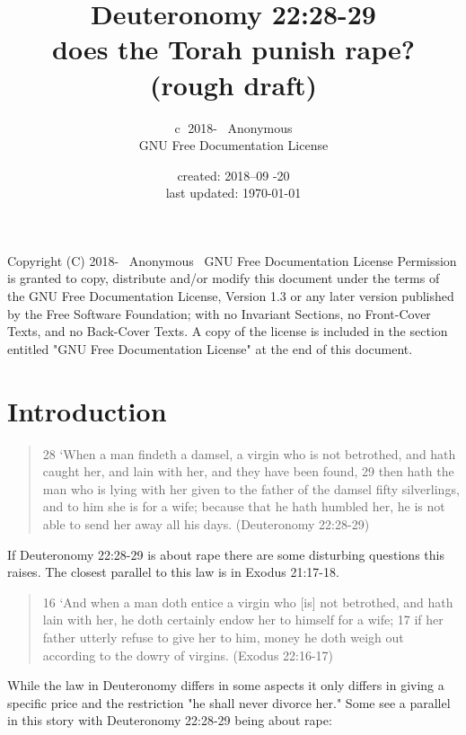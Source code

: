 \documentclass[11pt]{article}
\title{\textbf{Deuteronomy 22:28-29} \large \\ does the Torah punish rape? (rough draft) }
\author{\textcircled{c} 2018-\the\year
 \ Anonymous \\ GNU Free Documentation License  }
\date{created: 2018--09 -20 \\ last updated: \today{}}
\begin{document}
\maketitle
\tableofcontents 

\noindent \newline Copyright (C) 2018-\the\year
 \ Anonymous \ GNU Free Documentation License \newline
Permission is granted to copy, distribute and/or modify this document\newline
under the terms of the GNU Free Documentation License, Version 1.3\newline
or any later version published by the Free Software Foundation;\newline
with no Invariant Sections, no Front-Cover Texts, and no Back-Cover Texts.\newline
A copy of the license is included in the section entitled "GNU\newline
Free Documentation License" at the end of this document.

\section{Introduction}

\begin{quote}
28 `When a man findeth a damsel, a virgin who is not betrothed, and hath caught her, and lain with her, and they have been found,
29 then hath the man who is lying with her given to the father of the damsel fifty silverlings, and to him she is for a wife; because that he hath humbled her, he is not able to send her away all his days. (Deuteronomy 22:28-29)
\end{quote}

If Deuteronomy 22:28-29 is about rape there are some disturbing questions this raises. The closest parallel to this law is in Exodus 21:17-18.

\begin{quote}
16 `And when a man doth entice a virgin who [is] not betrothed, and hath lain with her, he doth certainly endow her to himself for a wife;
17 if her father utterly refuse to give her to him, money he doth weigh out according to the dowry of virgins. (Exodus 22:16-17)
\end{quote}

While the law in Deuteronomy differs in some aspects it only differs in giving a specific price and the restriction "he shall never divorce her." Some see a parallel in this story with Deuteronomy 22:28-29 being about rape:
\end{document}
